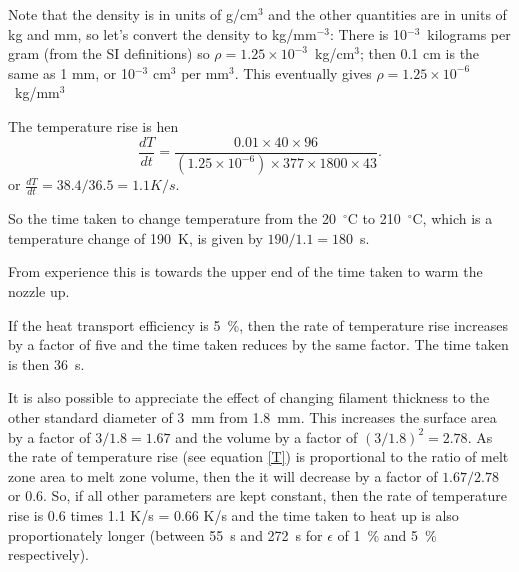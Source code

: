 Note that the density is in units of g/cm$^{3}$ and the other quantities are in units of kg and mm, so let's convert the density to kg/mm$^{-3}$: There is 10$^{-3}$~kilograms per gram (from the SI definitions) so $\rho = 1.25 \times 10^{-3}$~kg/cm$^{3}$; then 0.1 cm is the same as 1 mm, or 10$^{-3}$ cm$^{3}$ per mm$^{3}$. This eventually gives $\rho = 1.25 \times 10^{-6}$~kg/mm$^{3}$


The temperature rise is hen 
\begin{equation}
\frac{dT}{dt} = \frac{0.01 \times 40 \times 96 }{\left( 1.25 \times 10^{-6}\right) \times 377 \times 1800 \times 43}. 
\end{equation}
or $\frac{dT}{dt} = 38.4/36.5 = 1.1 K/s$.  

So the time taken to change temperature from the 20~$^{\circ}$C to 210~$^{\circ}$C, which is a temperature change of 190~K, is given by $190 / 1.1 = 180$~s. 

From experience this is towards the upper end of the time taken to warm the nozzle up. 

If the heat transport efficiency is 5~\%, then the rate of temperature rise increases by a factor of five and the time taken reduces by the same factor. The time taken is then 36~s.  

It is also possible to appreciate the effect of changing filament thickness to the other standard diameter of 3~mm from 1.8~mm. This increases the surface area by a factor of $3/1.8 = 1.67$ and the volume by a factor of $\left( 3/1.8 \right)^{2} = 2.78$. As the rate of temperature rise (see equation \ref{T}) is proportional to the ratio of melt zone area to melt zone volume, then the it will decrease by a factor of $1.67 / 2.78$ or 0.6. So, if all other parameters are kept constant, then the rate of temperature rise is 0.6 times 1.1 K/s = 0.66 K/s and the time taken to heat up is also proportionately longer (between 55~s and 272~s for $\epsilon$ of 1~\% and 5~\% respectively). 







